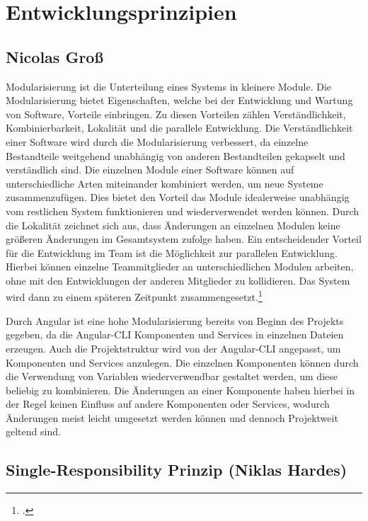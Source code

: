 
\section{Entwicklungsprinzipien}

\subsection*{Nicolas Groß}

Modularisierung ist die Unterteilung eines Systems in kleinere Module. Die Modularisierung bietet Eigenschaften, welche bei der Entwicklung und Wartung von Software, Vorteile einbringen.  Zu diesen Vorteilen zählen Verständlichkeit, Kombinierbarkeit, Lokalität und die parallele Entwicklung. Die Verständlichkeit einer Software wird durch die Modularisierung verbessert, da einzelne Bestandteile weitgehend unabhängig von anderen Bestandteilen gekapselt und verständlich sind. Die einzelnen Module einer Software können auf unterschiedliche Arten miteinander kombiniert werden, um neue Systeme zusammenzufügen. Dies bietet den Vorteil das Module idealerweise unabhängig vom restlichen System funktionieren und wiederverwendet werden können. Durch die Lokalität zeichnet sich aus, dass Änderungen an einzelnen Modulen keine größeren Änderungen im Gesamtsystem zufolge haben. Ein entscheidender Vorteil für die Entwicklung im Team ist die Möglichkeit zur parallelen Entwicklung. Hierbei können einzelne Teammitglieder an unterschiedlichen Modulen arbeiten, ohne mit den Entwicklungen der anderen Mitglieder zu kollidieren. Das System wird dann zu einem späteren Zeitpunkt zusammengesetzt.\footcite[.vgl]{Schmidauer2002}

Durch Angular ist eine hohe Modularisierung bereits von Beginn des Projekts gegeben, da die Angular-CLI Komponenten und Services in einzelnen Dateien erzeugen. Auch die Projektstruktur wird von der Angular-CLI angepasst, um Komponenten und Services anzulegen. Die einzelnen Komponenten können durch die Verwendung von Variablen wiederverwendbar gestaltet werden, um diese beliebig zu kombinieren. Die Änderungen an einer Komponente haben hierbei in der Regel keinen Einfluss auf andere Komponenten oder Services, wodurch Änderungen meist leicht umgesetzt werden können und dennoch Projektweit geltend sind.

\subsection*{Single-Responsibility Prinzip (Niklas Hardes)}

